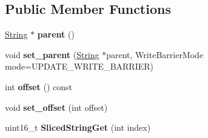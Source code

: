\subsection*{Public Member Functions}
\begin{DoxyCompactItemize}
\item 
\hypertarget{classv8_1_1internal_1_1_sliced_string_a7ea2c5e478790e6bdda1391caf22a838}{}\hyperlink{classv8_1_1internal_1_1_string}{String} $\ast$ {\bfseries parent} ()\label{classv8_1_1internal_1_1_sliced_string_a7ea2c5e478790e6bdda1391caf22a838}

\item 
\hypertarget{classv8_1_1internal_1_1_sliced_string_a7fb536147ef4fe0a5fb8cabea667d93f}{}void {\bfseries set\+\_\+parent} (\hyperlink{classv8_1_1internal_1_1_string}{String} $\ast$parent, Write\+Barrier\+Mode mode=U\+P\+D\+A\+T\+E\+\_\+\+W\+R\+I\+T\+E\+\_\+\+B\+A\+R\+R\+I\+E\+R)\label{classv8_1_1internal_1_1_sliced_string_a7fb536147ef4fe0a5fb8cabea667d93f}

\item 
\hypertarget{classv8_1_1internal_1_1_sliced_string_a7e9c5c8b3e9f3fa4c68d849029ff47c7}{}int {\bfseries offset} () const \label{classv8_1_1internal_1_1_sliced_string_a7e9c5c8b3e9f3fa4c68d849029ff47c7}

\item 
\hypertarget{classv8_1_1internal_1_1_sliced_string_ac2d7335184687e4095a451e7f0a234d9}{}void {\bfseries set\+\_\+offset} (int offset)\label{classv8_1_1internal_1_1_sliced_string_ac2d7335184687e4095a451e7f0a234d9}

\item 
\hypertarget{classv8_1_1internal_1_1_sliced_string_a8287c8f2ffdd4bc311b1923d17002717}{}uint16\+\_\+t {\bfseries Sliced\+String\+Get} (int index)\label{classv8_1_1internal_1_1_sliced_string_a8287c8f2ffdd4bc311b1923d17002717}

\end{DoxyCompactItemize}
